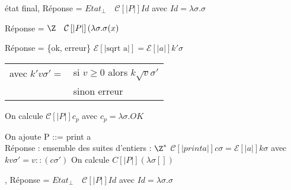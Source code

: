 \documentclass[10pt,a4paper]{article}
\newcommand{\E}{\mathcal{E}}
\newcommand{\semm}[1]{\left[| #1 | \right]}
\begin{document}
\begin{ex}[1] état final, Réponse = $Etat_{\perp} \quad \mathcal{C}\semm{P} Id$ avec $Id = \lambda \sigma . \sigma$
\end{ex}
\begin{ex}[2]  Réponse = $\Z \quad \mathcal{C}\semm{P} ( \lambda \sigma . \sigma(x)$
\end{ex}
\begin{ex}[3]  Réponse = \{ok, erreur\} $\E\semm{\text{sqrt a}} = \E\semm{a} k' \sigma$ 
\begin{tabular}{ll}
 avec $k' v \sigma' = $ & si $v \geq 0$ alors $ k \sqrt{v} \sigma'$\\
  & sinon erreur\\
\end{tabular}
On calcule $\mathcal{C}\semm{P} c_p$ avec $c_p = \lambda \sigma . OK$
\end{ex}
\begin{ex}[4 : affichage] On ajoute P ::= print a\\
Réponse : ensemble des suites d'entiers : $\Z^*$
$\mathcal{C}\semm{print a} c \sigma = \E\semm{a} k \sigma$ avec $k v \sigma' = v::(c \sigma')$
On calcule ${C}\semm{P} (\lambda \sigma [])$

, Réponse = $Etat_{\perp} \quad \mathcal{C}\semm{P} Id$ avec $Id = \lambda \sigma . \sigma$
\end{ex}
\end{document}
